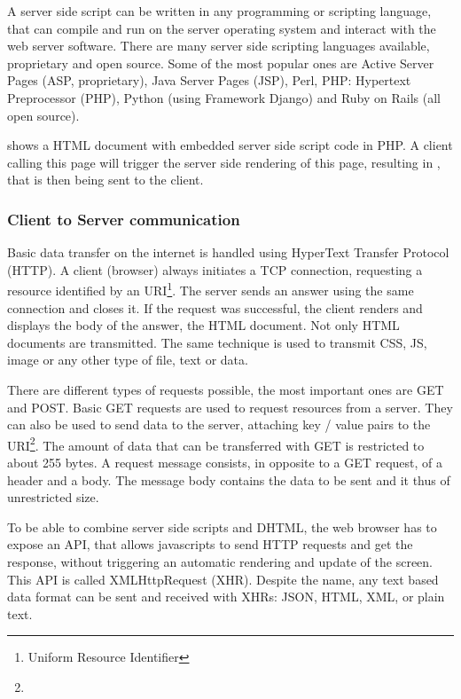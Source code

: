 A server side script can be written in any programming or scripting language, that can compile and run on the server operating system and interact with the web server software.
There are many server side scripting languages available, proprietary and open source.
Some of the most popular ones are Active Server Pages (ASP, proprietary), Java Server Pages (JSP), Perl, PHP: Hypertext Preprocessor (PHP), Python (using Framework Django) and Ruby on Rails (all open source).

 shows a HTML document with embedded server side script code in PHP.
A client calling this page will trigger the server side rendering of this page, resulting in , that is then being sent to the client.



\subsubsection{Client to Server communication}
\label{sec:servercom}

Basic data transfer on the internet is handled using HyperText Transfer Protocol (HTTP).
A client (browser) always initiates a TCP connection, requesting a resource identified by an URI\footnote{Uniform Resource Identifier}.
The server sends an answer using the same connection and closes it.
If the request was successful, the client renders and displays the body of the answer, the HTML document. Not only HTML documents are transmitted. The same technique is used to transmit CSS, JS, image or any other type of file, text or data.

There are different types of requests possible, the most important ones are GET and POST.
Basic GET requests are used to request resources from a server.
They can also be used to send data to the server, attaching key / value pairs to the URI\footnote{}. The amount of data that can be transferred with GET is restricted to about 255 bytes.
A  request message consists, in opposite to a GET request, of a header and a body.
The message body contains the data to be sent and it thus of unrestricted size.

To be able to combine server side scripts and DHTML, the web browser has to expose an API, that allows javascripts to send HTTP requests and get the response, without triggering an automatic rendering and update of the screen.
This API is called XMLHttpRequest (XHR). Despite the name, any text based data format can be sent and received with XHRs: JSON, HTML, XML, or plain text.

